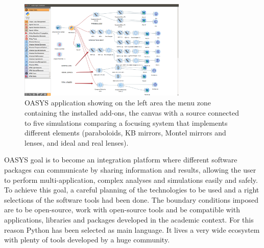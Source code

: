 \documentclass{aip-cp}
\begin{document}
\begin{figure}[h]
\includegraphics[width=8cm]{FIGURES/canvas.png}
\caption{OASYS application showing on the left area the menu zone containing the installed add-ons, the canvas with a source connected to five simulations comparing a focusing system that implements different elements (paraboloids, KB mirrors, Montel mirrors and lenses, and ideal and real lenses).}
\label{figCanvas}
\end{figure}

OASYS goal is to become an integration platform where different software packages can communicate by sharing information and results, allowing the user to perform multi-application, complex analyses and simulations easily and safely. To achieve this goal, a careful planning of the technologies to be used and a right selections of the software tools had been done. The boundary conditions imposed are to be open-source, work with open-source tools and be compatible with applications, libraries and packages developed in the academic context. For this reason Python has been selected as main language. It lives a very wide ecosystem with plenty of tools developed by a huge community. 
\end{document}

